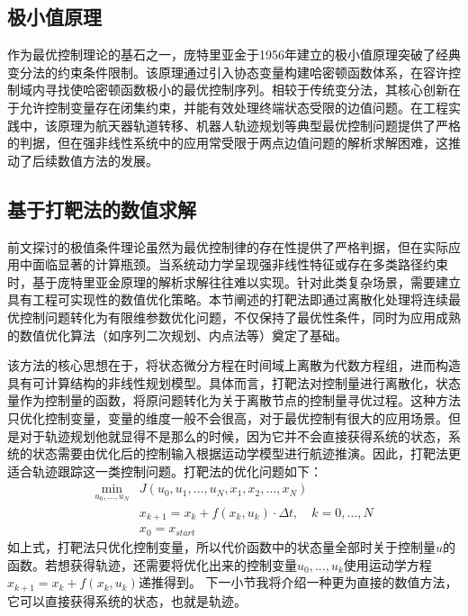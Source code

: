 \documentclass[master,academic]{ysuthesis} %
\begin{document}
	\subsection{极小值原理}
	作为最优控制理论的基石之一，庞特里亚金于1956年建立的极小值原理\cite{mehta2009q}突破了经典变分法的约束条件限制。该原理通过引入协态变量构建哈密顿函数体系，在容许控制域内寻找使哈密顿函数极小的最优控制序列。相较于传统变分法，其核心创新在于允许控制变量存在闭集约束，并能有效处理终端状态受限的边值问题。在工程实践中，该原理为航天器轨道转移、机器人轨迹规划等典型最优控制问题提供了严格的判据，但在强非线性系统中的应用常受限于两点边值问题的解析求解困难，这推动了后续数值方法的发展。
	
	\subsection{基于打靶法的数值求解}
	前文探讨的极值条件理论虽然为最优控制律的存在性提供了严格判据，但在实际应用中面临显著的计算瓶颈。当系统动力学呈现强非线性特征或存在多类路径约束时，基于庞特里亚金原理的解析求解往往难以实现。针对此类复杂场景，需要建立具有工程可实现性的数值优化策略。本节阐述的打靶法即通过离散化处理将连续最优控制问题转化为有限维参数优化问题，不仅保持了最优性条件，同时为应用成熟的数值优化算法（如序列二次规划、内点法等）奠定了基础\cite{osborne1969shooting}。

	该方法的核心思想在于，将状态微分方程在时间域上离散为代数方程组，进而构造具有可计算结构的非线性规划模型。具体而言，打靶法对控制量进行离散化，状态量作为控制量的函数，将原问题转化为关于离散节点的控制量寻优过程。这种方法只优化控制变量，变量的维度一般不会很高，对于最优控制有很大的应用场景。但是对于轨迹规划他就显得不是那么的时候，因为它并不会直接获得系统的状态，系统的状态需要由优化后的控制输入根据运动学模型进行航迹推演。因此，打靶法更适合轨迹跟踪这一类控制问题。打靶法的优化问题如下：
	\begin{equation}
	\begin{aligned}
		\min_{u_0,...,u_N} & J(u_0,u_1,\ldots,u_N,x_1,x_2,\ldots,x_N) \\
		& x_{k+1}=x_k+f(x_k,u_k)\cdot \Delta t,\quad k=0,\ldots,N \\
		& x_{0}=x_{start}
	\end{aligned}
	\end{equation}
	如上式，打靶法只优化控制变量，所以代价函数中的状态量全部时关于控制量$u$的函数。若想获得轨迹，还需要将优化出来的控制变量$u_0,...,u_k$使用运动学方程$x_{k+1}=x_k+f(x_k,u_k)$递推得到。
	下一小节我将介绍一种更为直接的数值方法，它可以直接获得系统的状态，也就是轨迹。
	
\end{document}

